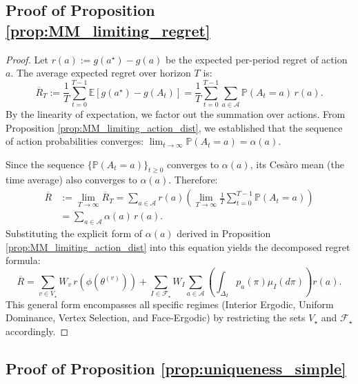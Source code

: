 \documentclass[12pt]{article}
\begin{document}
\subsection{Proof of Proposition \ref{prop:MM_limiting_regret}}
\begin{proof}
    Let $r(a) := g(a^\star) - g(a)$ be the expected per-period regret of action $a$. The average expected regret over horizon $T$ is:
    \begin{equation}
        \overline{R}_T := \frac{1}{T} \sum_{t=0}^{T-1} \mathbb{E}[g(a^\star) - g(A_t)] = \frac{1}{T} \sum_{t=0}^{T-1} \sum_{a \in \mathcal{A}} \mathbb{P}(A_t = a) \, r(a).
    \end{equation}
    By the linearity of expectation, we factor out the summation over actions. From Proposition \ref{prop:MM_limiting_action_dist}, we established that the sequence of action probabilities converges: $\lim_{t \to \infty} \mathbb{P}(A_t = a) = \alpha(a)$.
    
    Since the sequence $\{\mathbb{P}(A_t = a)\}_{t \ge 0}$ converges to $\alpha(a)$, its Cesàro mean (the time average) also converges to $\alpha(a)$. Therefore:
    \begin{align}
        \overline{R} &:= \lim_{T \to \infty} \overline{R}_T = \sum_{a \in \mathcal{A}} r(a) \left( \lim_{T \to \infty} \frac{1}{T} \sum_{t=0}^{T-1} \mathbb{P}(A_t = a) \right) \nonumber \\
        &= \sum_{a \in \mathcal{A}} \alpha(a) \, r(a).
    \end{align}
    Substituting the explicit form of $\alpha(a)$ derived in Proposition \ref{prop:MM_limiting_action_dist} into this equation yields the decomposed regret formula:
    \begin{equation}
         \overline{R} = \sum_{v \in V_\star} W_v \, r(\phi(\theta^{(v)})) + \sum_{I \in \mathcal{F}_\star} W_I \sum_{a \in \mathcal{A}} \left( \int_{\Delta_I} p_a(\pi) \mu_I(d\pi) \right) r(a).
    \end{equation}
    This general form encompasses all specific regimes (Interior Ergodic, Uniform Dominance, Vertex Selection, and Face-Ergodic) by restricting the sets $V_\star$ and $\mathcal{F}_\star$ accordingly.
\end{proof}

\subsection{Proof of Proposition \ref{prop:uniqueness_simple}}
    
\end{document}
